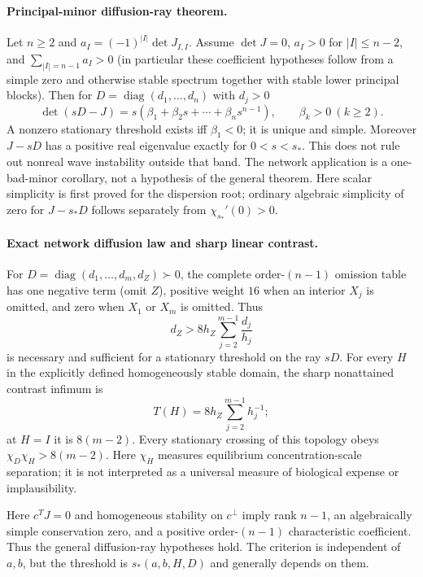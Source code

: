 \documentclass[10pt]{article}
\newcommand{\diag}{\operatorname{diag}}
\begin{document}
\paragraph{Principal-minor diffusion-ray theorem.}
Let $n\ge2$ and $a_I=(-1)^{|I|}\det J_{I,I}$.  Assume $\det J=0$, $a_I>0$ for
$|I|\le n-2$, and $\sum_{|I|=n-1}a_I>0$ (in particular these
coefficient hypotheses follow from a simple zero and otherwise stable
spectrum together with stable lower principal blocks).  Then for
$D=\diag(d_1,\ldots,d_n)$ with $d_j>0$
\[
\det(sD-J)=s(\beta_1+\beta_2s+\cdots+\beta_ns^{n-1}),\qquad \beta_k>0\ (k\ge2).
\]
A nonzero stationary threshold exists iff $\beta_1<0$; it is unique and simple. Moreover $J-sD$ has a positive real eigenvalue exactly for $0<s<s_*$. This does not rule out nonreal wave instability outside that band.  The
network application is a one-bad-minor corollary, not a hypothesis of the
general theorem.  Here scalar simplicity is first proved for the dispersion
root; ordinary algebraic simplicity of zero for $J-s_*D$ follows separately
from $\chi_{s_*}'(0)>0$.

\paragraph{Exact network diffusion law and sharp linear contrast.}
For $D=\diag(d_1,\ldots,d_m,d_Z)\succ0$, the complete order-$(n-1)$ omission table has one negative term (omit $Z$), positive weight $16$ when an interior $X_j$ is omitted, and zero when $X_1$ or $X_m$ is omitted. Thus
\[
\boxed{d_Z>8h_Z\sum_{j=2}^{m-1}\frac{d_j}{h_j}}
\]
is necessary and sufficient for a stationary threshold on the ray $sD$. For every $H$ in the explicitly defined homogeneously stable domain, the
sharp nonattained contrast infimum is
\[
T(H)=8h_Z\sum_{j=2}^{m-1}h_j^{-1};
\]
at $H=I$ it is $8(m-2)$. Every stationary crossing of this topology obeys
$\chi_D\chi_H>8(m-2)$.  Here $\chi_H$ measures equilibrium
concentration-scale separation; it is not interpreted as a universal measure
of biological expense or implausibility.

Here $c^TJ=0$ and homogeneous stability on $c^\perp$ imply rank $n-1$, an
algebraically simple conservation zero, and a positive order-$(n-1)$
characteristic coefficient.  Thus the general diffusion-ray hypotheses hold.
The criterion is independent of $a,b$, but the threshold is
$s_*(a,b,H,D)$ and generally depends on them.

\newpage
\end{document}
